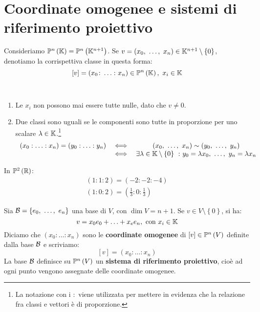 \section{Coordinate omogenee e sistemi di riferimento proiettivo}
Consideriamo $\proj[n]{\kamp}=\proj{\kamp^{n+1}}$. Se $v=\left(x_0,\ \ldots,\ x_n\right)\in\kamp^{n+1}\setminus\left\{0\right\}$, denotiamo la corrispettiva classe in questa forma:
\begin{equation}
\left[v\right]=\left(x_0\colon \ldots\colon x_n\right)\in\proj[n]{\kamp},\ x_i\in\kamp
\end{equation}
\begin{observe}~{}
	\begin{enumerate}
		\item Le $x_i$ non possono mai essere tutte nulle, dato che $v\neq 0$.
		\item Due classi sono uguali se le componenti sono tutte in proporzione per uno scalare $\lambda\in\mathbb{K}$.\footnote{La notazione con i $\colon$ viene utilizzata per mettere in evidenza che la relazione fra classi e vettori è di proporzione.}
		\begin{equation*}
			\begin{array}{ccc}
			\left(x_0:\ldots:x_n\right)=\left(y_0:\ldots:y_n\right)&\iff&\left(x_0,\ \ldots,\ x_n\right)\sim\left(y_0,\ \ldots,\ y_n\right)\\&\iff& \exists \lambda\in\kamp\setminus\left\{0\right\}\ \colon y_0=\lambda x_0,\ \ldots,\ y_n=\lambda x_n
			\end{array}
		\end{equation*}
	\end{enumerate}
\end{observe}
\begin{examples}
	In $\proj[2]{\realset}$:
	\begin{gather*}
		\left(1\colon1\colon2\right) = \left(-2\colon-2\colon-4\right)\\
		\left(1\colon0\colon2\right) = \left(\frac{1}{3}\colon0\colon\frac{1}{3}\right)
	\end{gather*}
\end{examples}
\begin{define}
	Sia $\basis=\left\{e_0,\ \ldots,\ e_n\right\}$ una base di $V$, con $\dim V=n+1$. Se $v\in V\setminus\left\{0\right\}$, si ha:
	\begin{equation*}
		v=x_0e_0+\ldots+x_ee_n,\ \text{con}\ x_i\in\kamp
	\end{equation*}
Diciamo che $\left(x_0\colon\ldots\colon x_n\right)$ sono le \textbf{coordinate omogenee} di $\left[v\right]\in\proj{V}$ definite dalla base $\mathcal{B}$ e scriviamo:
\begin{equation}
	\left[v\right]=\left(x_0\colon\ldots\colon x_n\right)
\end{equation}
La base $\mathcal{B}$ definisce su $\proj{V}$ un \textbf{sistema di riferimento proiettivo}, cioè ad ogni punto vengono assegnate delle coordinate omogenee. 
\end{define}
